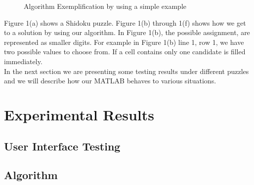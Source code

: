 \documentclass[12pt,a4paper]{article} %
\begin{document}
\begin{figure}[ht!]
\begin{center}
%
\end{center}
\caption{%
Algorithm Exemplification by using a simple example
}%
\end{figure}
Figure 1(a) shows a Shidoku puzzle. Figure 1(b) through 1(f) shows how we get to a solution by using our algorithm. In Figure 1(b), the possible assignment, are represented as smaller digits. For example in Figure 1(b) line 1, row 1, we have two possible values to choose from. If a cell contains only one candidate is filled immediately.
\newline
\\ In the next section we are presenting some testing results under different puzzles and we will describe how our MATLAB behaves to various situations.

\section{Experimental Results}
\subsection{User Interface Testing}
\subsection{Algorithm}
\end{document}
